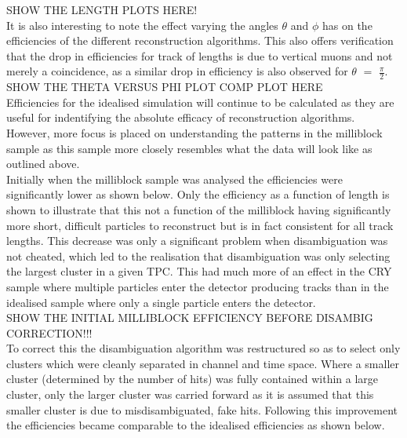 \documentclass[11pt]{report} %
\begin{document}
{SHOW THE LENGTH PLOTS HERE! \\

It is also interesting to note the effect varying the angles $\theta$ and $\phi$ has on the efficiencies of the different reconstruction algorithms. This also offers verification that the drop in efficiencies for track of lengths is due to vertical muons and not merely a coincidence, as a similar drop in efficiency is also observed for $\theta$ $=$ $\frac{\pi}{2}$. \\

SHOW THE THETA VERSUS PHI PLOT COMP PLOT HERE \\

Efficiencies for the idealised simulation will continue to be calculated as they are useful for indentifying the absolute efficacy of reconstruction algorithms. However, more focus is placed on understanding the patterns in the milliblock sample as this sample more closely resembles what the data will look like as outlined above. \\

Initially when the milliblock sample was analysed the efficiencies were significantly lower as shown below. Only the efficiency as a function of length is shown to illustrate that this not a function of the milliblock having significantly more short, difficult particles to reconstruct but is in fact consistent for all track lengths. This decrease was only a significant problem when disambiguation was not cheated, which led to the realisation that disambiguation was only selecting the largest cluster in a given TPC. This had much more of an effect in the CRY sample where multiple particles enter the detector producing tracks than in the idealised sample where only a single particle enters the detector. \\

SHOW THE INITIAL MILLIBLOCK EFFICIENCY BEFORE DISAMBIG CORRECTION!!! \\

To correct this the disambiguation algorithm was restructured so as to select only clusters which were cleanly separated in channel and time space. Where a smaller cluster (determined by the number of hits) was fully contained within a large cluster, only the larger cluster was carried forward as it is assumed that this smaller cluster is due to misdisambiguated, fake hits. Following this improvement the efficiencies became comparable to the idealised efficiencies as shown below. \\

}
\end{document}
